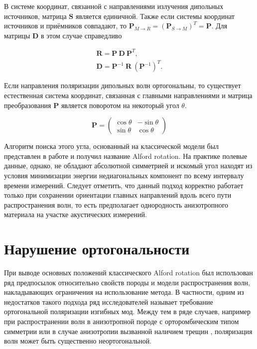 \documentclass[a4paper,11pt]{article}
\begin{document}
В системе координат, связанной с направлениями излучения дипольных источников, матрица $\mathbf{S}$ является единичной. Также если системы координат источников и приёмников совпадают, то $\mathbf{P}_{M \rightarrow R}=({\mathbf{P}_{S \rightarrow M}})^{T} = \mathbf{P}$. Для матрицы $\mathbf{D}$ в этом случае справедливо

\begin{gather}
	\mathbf{R} = \mathbf{P} \ \mathbf{D} \ \mathbf{P}^T, \label{eq:alford_symmetric} \\ 
	\mathbf{D} = \mathbf{P}^{-1} \ \mathbf{R} \ (\mathbf{P}^{-1})^{T}.
\end{gather}

Если направления поляризации дипольных волн ортогональны, то существует естественная система координат, связанная с главными направлениями и матрица преобразования $\mathbf{P}$ является поворотом на некоторый угол $\theta$. 

\begin{equation*}
	\mathbf{P} = \left(
	\begin{array}{cc}
	\cos \theta &-\sin \theta \\ 
	\sin \theta & \cos \theta
	\end{array} 
	\right) 
\end{equation*}

Алгоритм поиска этого угла, основанный на классической модели был представлен в работе \cite{Alford1986} и получил название Alford rotation. На практике полевые данные, однако, не обладают абсолютной симметрией и искомый угол находят из условия минимизации энергии недиагональных компонент по всему интервалу времени измерений. Следует отметить, что данный подход корректно работает только при сохранении ориентации главных направлений вдоль всего пути распространения волн, то есть предполагает однородность анизотропного материала на участке акустических измерений.

\section{Нарушение ортогональности}

При выводе основных положений классического Alford rotation был использован ряд предпосылок относительно свойств породы и модели распространения волн, накладывающих ограничения на использование метода. В частности, одним из недостатков такого подхода ряд исследователей называет требование ортогональной поляризации изгибных мод. Между тем в ряде случаев, например при распространении волн в анизотропной породе с орторомбическим типом симметрии \cite{Dellinger2001} или в случае анизотропии вызванной наличием трещин \cite{Nolte1996}, поляризация волн может быть существенно неортогональной. 
\end{document}
